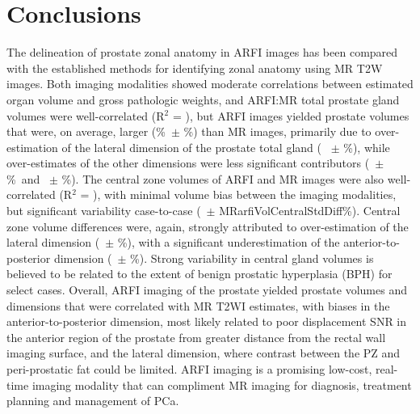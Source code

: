 \section{Conclusions}
The delineation of prostate zonal anatomy in ARFI images has been compared with
the established methods for identifying zonal anatomy using MR T2W images.
Both imaging modalities showed moderate correlations between estimated organ
volume and gross pathologic weights, and ARFI:MR total prostate gland volumes
were well-correlated (R$^2$ = \MRarfiVolTotalRsq), but ARFI images yielded
prostate volumes that were, on average, larger (\MRarfiVolTotalMeanDiff\%~$\pm$
\MRarfiVolTotalStdDiff\%) than MR images, primarily due to over-estimation of
the lateral dimension of the prostate total gland (\ARFImrTotalLatLatMeanPct~
$\pm$ \ARFImrTotalLatLatStdPct\%), while over-estimates of the other dimensions
were less significant contributors (\ARFImrTotalAntPostMeanPct~$\pm$
\ARFImrTotalAntPostStdPct\%~and \ARFImrTotalApexBaseMeanPct~$\pm$
\ARFImrTotalApexBaseStdPct\%).  The central zone volumes of ARFI and MR images
were also well-correlated (R$^2$ = \MRarfiVolCentralRsq), with minimal volume
bias between the imaging modalities, but significant variability case-to-case
(\MRarfiVolCentralMeanDiff~$\pm$ MRarfiVolCentralStdDiff\%).  Central zone
volume differences were, again, strongly attributed to over-estimation of the
lateral dimension (\ARFImrCentralLatLatMeanPct~$\pm$
\ARFImrCentralLatLatStdPct\%), with a significant underestimation of the
anterior-to-posterior dimension (\ARFImrCentralAntPostMeanPct~$\pm$
\ARFImrCentralAntPostStdPct\%).  Strong variability in central gland volumes is
believed to be related to the extent of benign prostatic hyperplasia (BPH) for
select cases.  Overall, ARFI imaging of the prostate yielded prostate volumes
and dimensions that were correlated with MR T2WI estimates, with biases in the
anterior-to-posterior dimension, most likely related to poor displacement SNR
in the anterior region of the prostate from greater distance from the rectal
wall imaging surface, and the lateral dimension, where contrast between the PZ
and peri-prostatic fat could be limited.  ARFI imaging is a promising low-cost,
real-time imaging modality that can compliment MR imaging for diagnosis,
treatment planning and management of PCa.
